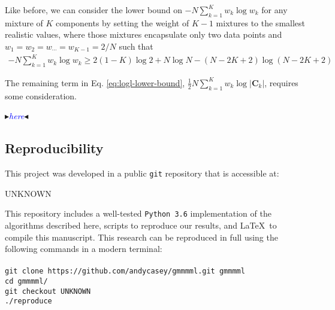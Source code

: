 \documentclass{elsarticle}
\newcommand{\giturl}{UNKNOWN}
\newcommand{\githash}{UNKNOWN}
\newcommand{\nbb}[2]{
    \fcolorbox{black}{cyan}{\bfseries\sffamily\scriptsize#1}
    {\sf$\blacktriangleright$\textcolor{blue}{\textit{#2}}$\blacktriangleleft$}
}
\newcommand{\andy}[1]{\nbb{Andy}{#1}}
\newcommand{\vect}[1]{\boldsymbol{\mathbf{#1}}}
\renewcommand{\vec}[1]{\vect{#1}}
\def\cov{C}
\def\weight{w}
\newcommand{\bashcommand}[1]{\noindent\texttt{#1}\\}
\begin{document}
\noindent{}Like before, we can consider the lower bound on $-N\sum_{k=1}^{K}\weight_{k}\log\weight_k$
for any mixture of $K$ components by setting the weight of $K - 1$ mixtures
to the smallest realistic values, where those mixtures encapsulate only two
data points and $w_{1} = w_2 = w_{\cdots} = w_{K-1} = 2/N$ such that
\begin{eqnarray}
	-N\sum_{k=1}^{K}\weight_{k}\log\weight_k \geq 2(1-K)\log{2} + N\log{N} - (N-2K+2)\log{\left(N - 2K + 2\right)}
\end{eqnarray}




The remaining term in Eq. \ref{eq:logl-lower-bound}, $\frac{1}{2}N\sum_{k=1}^{K}\weight_{k}\log|\vec{\cov}_k|$, requires some  consideration.

\andy{here}


\subsection{Reproducibility} \label{sec:reproducibility}

\noindent{}This project was developed in a public \texttt{git} repository that is 
accessible at:
\begin{center}
\giturl
\end{center}
\noindent{}This repository includes a well-tested \texttt{Python 3.6} implementation
of the algorithms described here, scripts to reproduce our results, and \LaTeX\ to compile this manuscript. This research can be reproduced in full using
the following commands in a modern terminal:\\\\
\bashcommand{git clone https://github.com/andycasey/gmmmml.git gmmmml}
\bashcommand{cd gmmmml/}
\bashcommand{git checkout \githash}
\bashcommand{./reproduce}
\end{document}

